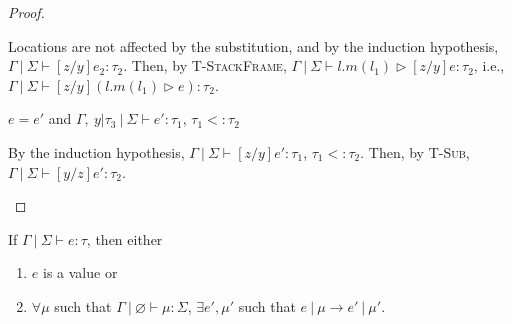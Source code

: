 \documentclass{llncs}
\newcommand{\pcase}[1][]{%
  \if\relax\detokenize{#1}\relax
    \def\thiscase{}%
  \else
    \def\thiscase{~#1}%
  \fi
  \item
}
\begin{document}
\begin{proof}
\begin{pcases}
Locations are not affected by the substitution, and by the induction hypothesis, $\Gamma~|~\Sigma \vdash [z/y]e_2 : \tau_2$. Then, by \textsc{T-StackFrame}, $\Gamma~|~\Sigma \vdash l.m(l_1) \rhd [z/y]e : \tau_2$, i.e., $\Gamma~|~\Sigma \vdash [z/y](l.m(l_1) \rhd e) : \tau_2$.
\\
\pcase[\textsc{T-Sub}]
$e = e'$ and $\Gamma,~y | \tau_3~|~\Sigma \vdash e' : \tau_1$, $\tau_1 <: \tau_2$

By the induction hypothesis, $\Gamma~|~\Sigma \vdash [z/y]e' : \tau_1$, $\tau_1 <: \tau_2$. Then, by \textsc{T-Sub}, $\Gamma~|~\Sigma \vdash [y/z]e' : \tau_2$.
\end{pcases}


\end{proof}



\begin{theorem}[Progress]
If $\Gamma~|~\Sigma \vdash e : \tau$, then either
\begin{enumerate}
\item $e$ is a value or
\item $\forall \mu$ such that $\Gamma~|~\varnothing \vdash \mu : \Sigma$,
   $\exists e', \mu'$ such that $e~|~\mu \rightarrow e'~|~\mu'$.
\end{enumerate}
\end{theorem}
\end{document}
